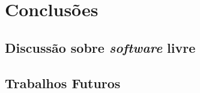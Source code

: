 \chapter{Conclusões}
\label{chap:conclusoes}


\section{Discussão sobre \textit{software} livre}



\section{Trabalhos Futuros}
